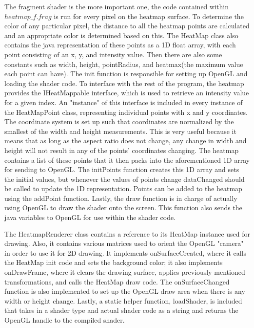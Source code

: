 The fragment shader is the more important one, the code contained within $heatmap\_f.frag$ is run for every pixel on the heatmap surface. To determine the color of any particular pixel, the distance to all the heatmap points are calculated and an appropriate color is determined based on this.
The HeatMap class also contains the java representation of these points as a 1D float array, with each point consisting of an x, y, and intensity value.
Then there are also some constants such as width, height, pointRadius, and heatmax(the maximum value each point can have). The init function is responsible for setting up OpenGL and loading the shader code. To interface with the rest of the program, the heatmap provides the IHeatMappable interface, which is used to retrieve an intensity value for a given index. An "instance" of this interface is included in every instance of the HeatMapPoint class, representing individual points with x and y coordinates. The coordinate system is set up such that coordinates are normalized by the smallest of the width and height measurements. This is very useful because it means that as long as the aspect ratio does not change, any change in width and height will not result in any of the points' coordinates changing. The heatmap contains a list of these points that it then packs into the aforementioned 1D array for sending to OpenGL. The initPoints function creates this 1D array and sets the initial values, but whenever the values of points change dataChanged should be called to update the 1D representation. Points can be added to the heatmap using the addPoint function.
Lastly, the draw function is in charge of actually using OpenGL to draw the shader onto the screen. This function also sends the java variables to OpenGL for use within the shader code.


The HeatmapRenderer class contains a reference to its HeatMap instance used for drawing. Also, it contains various matrices used to orient the OpenGL "camera" in order to use it for 2D drawing. It implements onSurfaceCreated, where it calls the HeatMap init code and sets the background color; it also implements onDrawFrame, where it clears the drawing surface, applies previously mentioned transformations, and calls the HeatMap draw code. The onSurfaceChanged function is also implemented to set up the OpenGL draw area when there is any width or height change. Lastly, a static helper function, loadShader, is included that takes in a shader type and actual shader code as a string and returns the OpenGL handle to the compiled shader.

